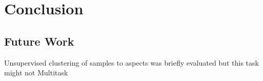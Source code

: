 \chapter{Conclusion}
\label{ch:conclusion}

\section{Future Work}

Unsupervised clustering of samples to aspects was briefly evaluated but this task might not Multitask

